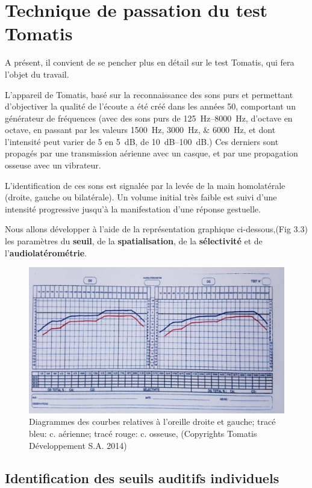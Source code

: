 \section{Technique de passation du test Tomatis}
A présent, il convient de se pencher plus en détail sur le test
Tomatis, qui fera l'objet du travail.

L'appareil de Tomatis, basé sur la reconnaissance des sons purs et
permettant d'objectiver la qualité de l'écoute
 a été créé dans les années 50, comportant un générateur de fréquences
 (avec
 des sons
  purs de \SIrange{125}{8000}{\Hz}, d'octave en octave, en passant par les valeurs
\SIlist{1500;3000;6000}{\Hz}, et dont l'intensité peut varier de 5 en \SI{5}{\dB}, de \SIrange{10}{100}{\dB}.)
Ces derniers sont propagés par une
  transmission aérienne avec un casque, et par une propagation osseuse
  avec un vibrateur.

  L'identification de ces sons est 
  signalée par la levée de la main homolatérale (droite, gauche ou
  bilatérale).
Un volume initial très faible est suivi d'une intensité
progressive jusqu'à la manifestation d'une réponse gestuelle.
 
Nous allons développer à l'aide de la représentation
graphique ci-dessous,(Fig 3.3) les paramètres du\textbf{ seuil}, de la
\textbf{spatialisation}, de la \textbf{sélectivité} et de l'\textbf{audiolatérométrie}.


\begin{figure}
	\centering
	\includegraphics[width=0.7\linewidth]{images/courbeideale.jpg}
	\caption{Diagrammes des courbes relatives à l'oreille droite et
          gauche; tracé bleu: c. aérienne; tracé rouge: c.
          osseuse, (Copyrights Tomatis Développement S.A.  2014) }
	\label{fig:courbeideale}
\end{figure}




\subsection{Identification des seuils auditifs individuels}

